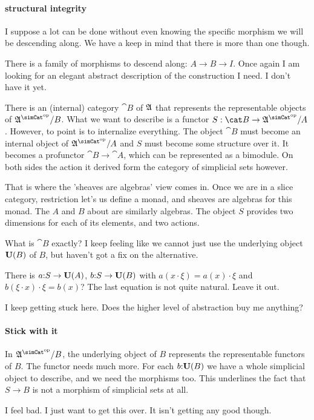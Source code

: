 \documentclass[csh.tex]{subfiles}
\begin{document}
\paragraph{structural integrity}
I suppose a lot can be done without even knowing the specific morphism we will be descending along. We have a keep in mind that there is more than one though.

There is a family of morphisms to descend along: $A\to B\to I$. Once again I am looking for an elegant abstract description of the construction I need.
I don't have it yet.

There is an (internal) category $\cat B$ of $\mathfrak A$ that represents the representable objects of $\ambient\s/B$. What we want to describe is a functor $S:\cat B\to \ambient\s/A$. However, to point is to internalize everything. The object $\cat B$ must become an internal object of $\ambient\s/A$ and $S$ must become some structure over it. It becomes a profunctor $\cat B \to \cat A$, which can be represented as a bimodule. On both sides the action it derived form the category of simplicial sets however.

That is where the 'sheaves are algebras' view comes in. Once we are in a slice category, restriction let's us define a monad, and sheaves are algebras for this monad. The $A$ and $B$ about are similarly algebras. The object $S$ provides two dimensions for each of its elements, and two actions. 

What is $\cat B$ exactly? I keep feeling like we cannot just use the underlying object $\mathbf{U}(B)$ of $B$, but haven't got a fix on the alternative.

There is $a\mathord : S\to \mathbf{U}(A)$, $b\mathord : S\to \mathbf{U} (B)$ with $a(x\cdot\xi) = a(x)\cdot\xi$ and $b(\xi\cdot x)\cdot \xi = b(x)$? The last equation is not quite natural. Leave it out.

I keep getting stuck here. Does the higher level of abstraction buy me
anything?

\paragraph{Stick with it}
In $\ambient\s/B$, the underlying object of $B$ represents the representable functors of $B$. The functor needs much more. For each $b\mathord :\mathbf{U}(B)$ we have a whole simplicial object to describe, and we need the morphisms too. This underlines the fact that $S\to B$ is not a morphism of simplicial sets at all.

I feel bad. I just want to get this over. It isn't getting any good though.
\end{document}
